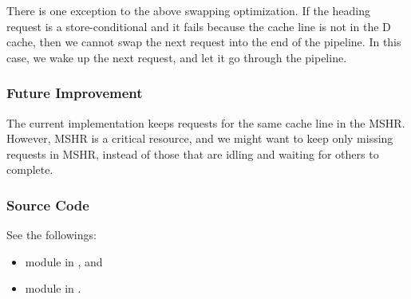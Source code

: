 There is one exception to the above swapping optimization.
If the heading request is a store-conditional and it fails because the cache line is not in the D cache, then we cannot swap the next request into the end of the pipeline.
In this case, we wake up the next request, and let it go through the pipeline.

\subsubsection{Future Improvement}
The current implementation keeps requests for the same cache line in the MSHR.
However, MSHR is a critical resource, and we might want to keep only missing requests in MSHR, instead of those that are idling and waiting for others to complete.

\subsubsection{Source Code}
See the followings:
\begin{itemize}
    \item module  in , and
    \item module  in .
\end{itemize}
